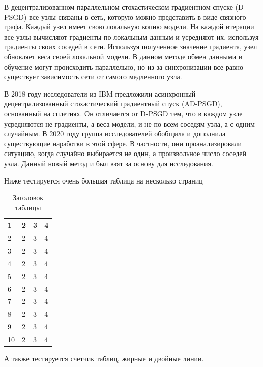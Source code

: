 \documentclass[a4paper,article,14pt]{extarticle}
\begin{document}
В децентрализованном параллельном стохастическом градиентном спуске (D-PSGD) \cite{o8, o9, o10} все узлы связаны в сеть, которую можно представить в виде связного графа. Каждый узел имеет свою локальную копию модели. На каждой итерации все узлы вычисляют градиенты по локальным данным и усредняют их, используя градиенты своих соседей в сети. Используя полученное значение градиента, узел обновляет веса своей локальной модели. В данном методе обмен данными и обучение могут происходить параллельно, но из-за синхронизации все равно существует зависимость сети от самого медленного узла.

В 2018 году исследователи из IBM предложили \cite{o11} асинхронный децентрализованный стохастический градиентный спуск (AD-PSGD), основанный на сплетнях. Он отличается от D-PSGD тем, что в каждом узле усредняются не градиенты, а веса модели, и не по всем соседям узла, а с одним случайным. В 2020 году группа исследователей \cite{decentralized_sgd} обобщила и дополнила существующие наработки в этой сфере. В частности, они проанализировали ситуацию, когда случайно выбирается не один, а произвольное число соседей узла. Данный новый метод и был взят за основу для исследования.

Ниже тестируется очень большая таблица на несколько страниц

\begin{center}
    \begin{longtable}{|p{2cm}|p{3cm}|p{7cm}|p{3cm}|}
    \caption{Заголовок таблицы}\\
    \hline
    1 & 2 & 3 & 4\\
    \hline
    2 & 2 & 3 & 4\\
    \hline
    3 & 2 & 3 & 4\\
    \hline
    4 & 2 & 3 & 4\\
    \hline
    5 & 2 & 3 & 4\\
    \hline
    6 & 2 & 3 & 4\\
    \hline
    7 & 2 & 3 & 4\\
    \hline
    8 & 2 & 3 & 4\\
    \hline
    9 & 2 & 3 & 4\\
    \hline
    10 & 2 & 3 & 4\\
    \hline


    \end{longtable}
\end{center}


А также тестируется счетчик таблиц, жирные и двойные линии.
\end{document}
